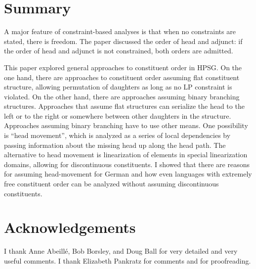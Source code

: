 \documentclass[output=paper
                ,modfonts
                ,nonflat
	        ,collection
	        ,collectionchapter
	        ,collectiontoclongg
 	        ,biblatex
                ,babelshorthands
                ,newtxmath
                ,draftmode
                ,colorlinks, citecolor=brown
]{./langsci/langscibook}
\begin{document}
\section{Summary}

A major feature of constraint-based analyses is that when no constraints are stated, there is
freedom. The paper discussed the order of head and adjunct: if the order of head and adjunct is not
constrained, both orders are admitted. 

This paper explored general approaches to constituent order in HPSG. On the one hand, there are
approaches to constituent order assuming flat constituent structure, allowing permutation of daughters as long as no LP
constraint is violated. On the other hand, there are approaches assuming binary branching
structures. Approaches that assume flat structures can serialize the head to the left or to the
right or somewhere between other daughters in the structure. Approaches assuming binary branching
have to use other means. One possibility is ``head movement'', which is analyzed as a series of
local dependencies by passing information about the missing head up along the head path. The
alternative to head movement is linearization of elements in special linearization domains, allowing
for discontinuous constituents. I showed that there are reasons for assuming head-movement for
German and how even languages with extremely free constituent order can be analyzed without assuming
discontinuous constituents.



\section*{Acknowledgements}

I thank Anne Abeillé, Bob Borsley, and Doug Ball for very detailed and very useful comments. I thank
Elizabeth Pankratz for comments and for proofreading.

{\sloppy
\printbibliography[heading=subbibliography,notkeyword=this] 
}
\end{document}
